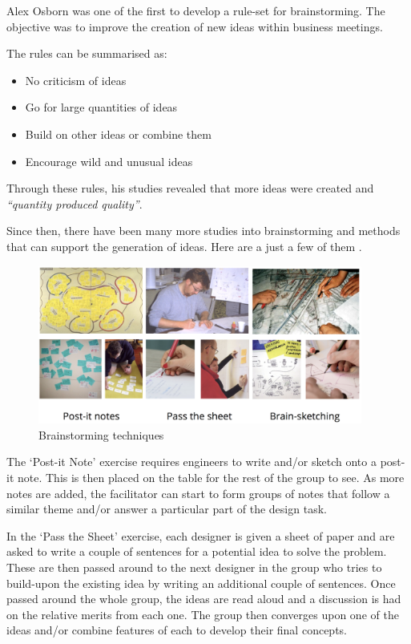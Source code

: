Alex Osborn was one of the first to develop a rule-set for brainstorming. The objective was to improve the creation of new ideas within business meetings. 

The rules can be summarised as:

\begin{itemize}
  \item No criticism of ideas
  \item Go for large quantities of ideas
  \item Build on other ideas or combine them
  \item Encourage wild and unusual ideas
\end{itemize}

Through these rules, his studies revealed that more ideas were created and \emph{``quantity produced quality''}.

Since then, there have been many more studies into brainstorming and methods that can support the generation of ideas. Here are a just a few of them .

\begin{figure}[h!]
    \centering
    \includegraphics[width=0.95\textwidth]{05_concept_generation/brainstorm.png}
    \caption{Brainstorming techniques}
    \label{fig-brainstorm}
\end{figure}


The `Post-it Note' exercise requires engineers to write and/or sketch onto a post-it note. This is then placed on the table for the rest of the group to see. As more notes are added, the facilitator can start to form groups of notes that follow a similar theme and/or answer a particular part of the design task.

In the `Pass the Sheet' exercise, each designer is given a sheet of paper and are asked to write a couple of sentences for a potential idea to solve the problem. These are then passed around to the next designer in the group who tries to build-upon the existing idea by writing an additional couple of sentences. Once passed around the whole group, the ideas are read aloud and a discussion is had on the relative merits from each one. The group then converges upon one of the ideas and/or combine features of each to develop their final concepts.

